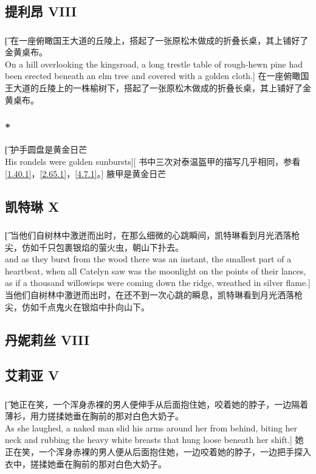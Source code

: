 \documentclass[12pt,a4paper]{article}
\begin{document}
\subsection{提利昂 VIII}
\subsubsection{}\t[
	在一座俯瞰国王大道的丘陵上，搭起了一张原松木做成的折叠长桌，其上铺好了金黄桌布。\\
	On a hill overlooking the kingsroad, a long trestle table of rough-hewn pine had been erected beneath an elm tree and covered with a golden cloth.]
	在一座俯瞰国王大道的丘陵上的一株榆树下，搭起了一张原松木做成的折叠长桌，其上铺好了金黄桌布。

\subsubsection{\color{red}*}\label{1.62.2}\t[
	护手圆盘是黄金日芒\\
	His rondels were golden sunbursts][
	书中三次对泰温盔甲的描写几乎相同，参看\ref{1.40.1}，\ref{2.65.1}，\ref{4.7.1}。]
	腋甲是黄金日芒
	
\subsection{凯特琳 X}
	\subsubsection{}\t[
		当他们自树林中激迸而出时，在那么细微的心跳瞬间，凯特琳看到月光洒落枪尖，仿如千只包裹银焰的萤火虫，朝山下扑去。\\
		and as they burst from the wood there was an instant, the smallest part of a heartbeat, when all Catelyn saw was the moonlight on the points of their lances, as if a thousand willowisps were coming down the ridge, wreathed in silver flame.]
		当他们自树林中激迸而出时，在还不到一次心跳的瞬息，凯特琳看到月光洒落枪尖，仿如千点鬼火在银焰中扑向山下。

\subsection{丹妮莉丝 VIII}

\subsection{艾莉亚 V}
\subsubsection{}\t[
	她正在笑，一个浑身赤裸的男人便伸手从后面抱住她，咬着她的脖子，一边隔着薄衫，用力搓揉她垂在胸前的那对白色大奶子。\\
	As she laughed, a naked man slid his arms around her from behind, biting her neck and rubbing the heavy white breasts that hung loose beneath her shift.]
	她正在笑，一个浑身赤裸的男人便从后面抱住她，一边咬着她的脖子，一边把手探入衣中，搓揉她垂在胸前的那对白色大奶子。
\end{document}
